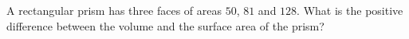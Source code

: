 A rectangular prism has three faces of areas $50$, $81$ and $128$. What is the positive difference between the volume and the surface area of the prism?
